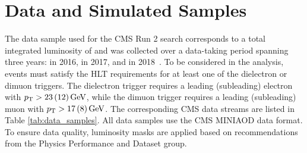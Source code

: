 \chapter{Data and Simulated Samples}\label{sec:data}

The data sample used for the CMS Run 2 \hzg{} search corresponds to a total integrated luminosity of \LumiT\fbinv and was collected over a data-taking period spanning three years: \Lumia\fbinv in 2016, \Lumib\fbinv in 2017, and \Lumic\fbinv in 2018~\cite{CMS-LUM-17-003,LUM-17-004,LUM-18-002}. 
To be considered in the analysis, events must satisfy the HLT requirements for at least one of the dielectron or dimuon triggers.
The dielectron trigger requires a leading (subleading) electron with
$p_{\mathrm{T}} > 23\,(12)\,\text{Ge\hspace{-.08em}V}$, while the dimuon trigger requires a leading (subleading) muon with $p_{\mathrm{T}} > 17\,(8)\,\text{Ge\hspace{-.08em}V}$.
The corresponding CMS data streams are listed in Table \ref{tab:data_samples}. All data samples use the CMS MINIAOD data format.
To ensure data quality, luminosity masks are applied based on recommendations from the Physics Performance and Dataset group.

